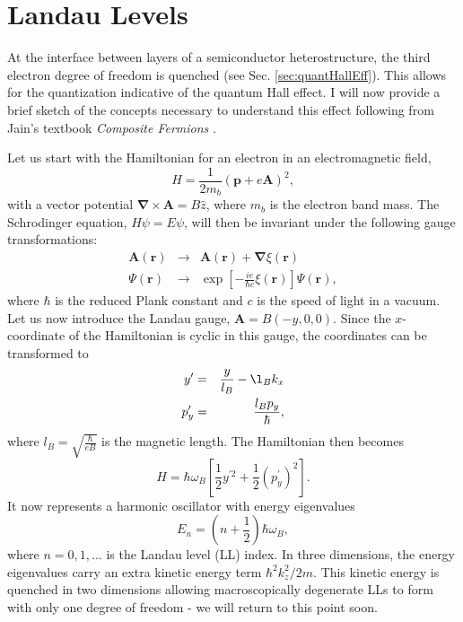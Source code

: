 \section{Landau Levels}\label{sec:landLev}
	At the interface between layers of a semiconductor heterostructure, the third electron degree of freedom is quenched (see Sec. \ref{sec:quantHallEff}). This allows for the quantization indicative of the quantum Hall effect. I will now provide a brief sketch of the concepts necessary to understand this effect following from Jain's textbook \textit{Composite Fermions} \cite{jain}. 

	Let us start with the Hamiltonian for an electron in an electromagnetic field,
	\begin{equation} \label{landLevHam}
    H=\frac{1}{2m_b}\left(\textbf{p}+e\textbf{A}\right)^2,
    \end{equation}
    with a vector potential $\mathbf{\nabla}\times\textbf{A}=B\hat{z}$, where $m_b$ is the electron band mass. The Schrodinger equation, $H\psi=E\psi$, will then be invariant under the following gauge transformations:
    \begin{eqnarray} \label{landGaugeTransf}
    \textbf{A}(\textbf{r}) &\rightarrow& \textbf{A}(\textbf{r})+\mathbf{\nabla}\xi(\textbf{r})\\
    \Psi(\textbf{r}) &\rightarrow& \exp\left[-\frac{ie}{\hbar c}\xi(\textbf{r})\right]\Psi(\textbf{r}),
    \end{eqnarray}
    where $\hbar$ is the reduced Plank constant and $c$ is the speed of light in a vacuum. Let us now introduce the Landau gauge, $\mathbf{A}=B(-y,0,0)$. Since the $x$-coordinate of the Hamiltonian is cyclic in this gauge, the coordinates can be transformed to
    \begin{eqnarray} \label{landGaugeCoordTransf}
    y^\prime &=& \frac{y}{l_B}-\l_B k_x\\
    p_y^\prime &=& \frac{l_B p_y}{\hbar},
    \end{eqnarray}
    where $l_B=\sqrt{\frac{\hbar}{eB}}$ is the magnetic length. The Hamiltonian then becomes
    \begin{equation} \label{transfHam}
    H=\hbar\omega_B\left[\frac{1}{2}y^{\prime2}+\frac{1}{2}(p_y^\prime)^2\right].
    \end{equation}
    It now represents a harmonic oscillator with energy eigenvalues
    \begin{equation} \label{landLevPlanEn}
    E_n=\left(n+\frac{1}{2}\right)\hbar\omega_B,
    \end{equation}
    where $n=0,1,...$ is the Landau level (LL) index. In three dimensions, the energy eigenvalues carry an extra kinetic energy term $\hbar^2k_z^2/2m$. This kinetic energy is quenched in two dimensions allowing macroscopically degenerate LLs to form with only one degree of freedom - we will return to this point soon.
    
